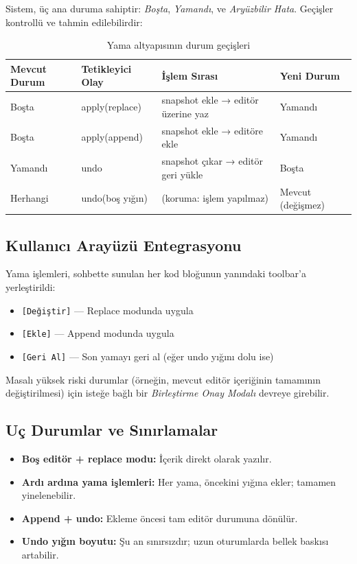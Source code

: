 \documentclass[12pt,a4paper]{article}
\begin{document}
Sistem, üç ana duruma sahiptir: \textit{Boşta}, \textit{Yamandı}, ve \textit{Aryüzbilir Hata}. Geçişler kontrollü ve tahmin edilebilirdir:

\begin{table}[h!]
  \centering\small
  \begin{tabular}{@{} P{2.8cm} P{3.2cm} P{3.8cm} P{2.8cm} @{}}
    \toprule
    Mevcut Durum & Tetikleyici Olay & İşlem Sırası & Yeni Durum \\
    \midrule
    Boşta & apply(replace) & snapshot ekle → editör üzerine yaz & Yamandı \\
    Boşta & apply(append)  & snapshot ekle → editöre ekle & Yamandı \\
    Yamandı & undo          & snapshot çıkar → editör geri yükle & Boşta \\
    Herhangi & undo(boş yığın) & (koruma: işlem yapılmaz) & Mevcut (değişmez) \\
    \bottomrule
  \end{tabular}
  \caption{Yama altyapısının durum geçişleri}
\end{table}

\subsection{Kullanıcı Arayüzü Entegrasyonu}

Yama işlemleri, sohbette sunulan her kod bloğunun yanındaki toolbar'a yerleştirildi:
\begin{itemize}[leftmargin=*]
  \item \texttt{[Değiştir]} — Replace modunda uygula
  \item \texttt{[Ekle]} — Append modunda uygula
  \item \texttt{[Geri Al]} — Son yamayı geri al (eğer undo yığını dolu ise)
\end{itemize}

Masalı yüksek riski durumlar (örneğin, mevcut editör içeriğinin tamamının değiştirilmesi) için isteğe bağlı bir \textit{Birleştirme Onay Modalı} devreye girebilir.

\subsection{Uç Durumlar ve Sınırlamalar}

\begin{itemize}[leftmargin=*]
  \item \textbf{Boş editör + replace modu:} İçerik direkt olarak yazılır.
  \item \textbf{Ardı ardına yama işlemleri:} Her yama, öncekini yığına ekler; tamamen yinelenebilir.
  \item \textbf{Append + undo:} Ekleme öncesi tam editör durumuna dönülür.
  \item \textbf{Undo yığın boyutu:} Şu an sınırsızdır; uzun oturumlarda bellek baskısı artabilir.
\end{itemize}
\end{document}
